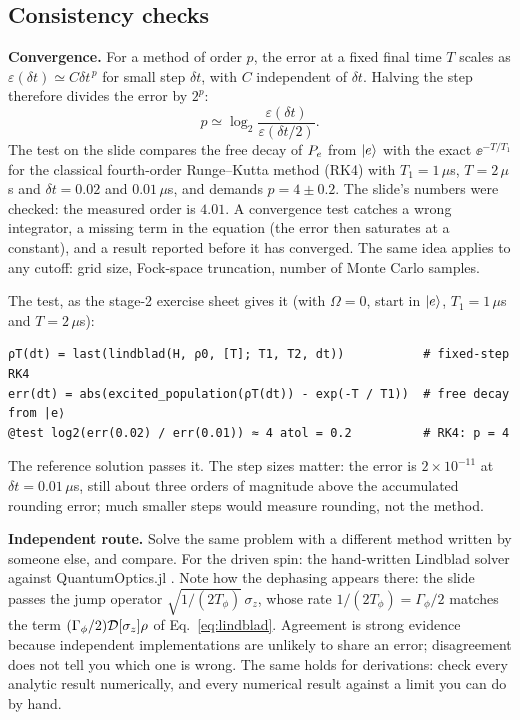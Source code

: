 \subsection{Consistency checks}

\textbf{Convergence.} For a method of order $p$, the error at a fixed final time $T$
scales as $\varepsilon(\delta t) \simeq C \delta t^{\,p}$ for small step $\delta t$, with
$C$ independent of $\delta t$. Halving the step therefore divides the error by $2^p$:
\begin{equation}
  p \simeq \log_2 \frac{\varepsilon(\delta t)}{\varepsilon(\delta t/2)} .
\end{equation}
The test on the slide compares the free decay of $P_e$ from $\ket{e}$ with the exact
$\ee^{-T/T_1}$ for the classical fourth-order Runge--Kutta method (RK4) with
$T_1 = 1\,\mu$s, $T = 2\,\mu$s and $\delta t = 0.02$ and $0.01\,\mu$s, and demands
$p = 4 \pm 0.2$. The slide's numbers were checked: the measured order is $4.01$. A
convergence test catches a wrong integrator, a missing term in the equation (the error
then saturates at a constant), and a result reported before it has converged. The same
idea applies to any cutoff: grid size, Fock-space truncation, number of Monte Carlo
samples.

The test, as the stage-2 exercise sheet  gives it (with
$\Omega = 0$, start in $\ket{e}$, $T_1 = 1\,\mu$s and $T = 2\,\mu$s):
\begin{lstlisting}
ρT(dt) = last(lindblad(H, ρ0, [T]; T1, T2, dt))           # fixed-step RK4
err(dt) = abs(excited_population(ρT(dt)) - exp(-T / T1))  # free decay from |e⟩
@test log2(err(0.02) / err(0.01)) ≈ 4 atol = 0.2          # RK4: p = 4
\end{lstlisting}
The reference solution passes it. The step sizes matter: the error is
$2 \times 10^{-11}$ at $\delta t = 0.01\,\mu$s, still about three orders of magnitude above
the accumulated rounding error; much smaller steps would measure rounding, not the method.

\textbf{Independent route.} Solve the same problem with a different method written by
someone else, and compare. For the driven spin: the hand-written Lindblad solver against
QuantumOptics.jl . Note how the dephasing appears there: the slide passes the
jump operator $\sqrt{1/(2T_\phi)}\,\sigma_z$, whose rate $1/(2T_\phi) = \Gamma_\phi/2$
matches the term $(\Gamma_\phi/2)\mathcal{D}[\sigma_z]\rho$ of Eq.~\eqref{eq:lindblad}.
Agreement is strong evidence because independent implementations are unlikely to share an
error; disagreement does not tell you which one is wrong. The same holds for derivations:
check every analytic result numerically, and every numerical result against a limit you
can do by hand.

